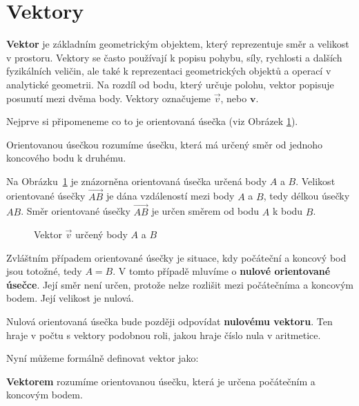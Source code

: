 \section{Vektory}\label{sec:vectors}

\textbf{Vektor} je základním geometrickým objektem, který reprezentuje směr a velikost v prostoru.
Vektory se často používají k popisu pohybu, síly, rychlosti a dalších fyzikálních veličin, 
ale také k reprezentaci geometrických objektů a operací v analytické geometrii.
Na rozdíl od bodu, který určuje polohu, vektor popisuje posunutí mezi dvěma body.
Vektory označujeme $\vec{v}$, nebo $\mathbf{v}$. 

Nejprve si připomeneme co to je orientovaná úsečka (viz Obrázek \ref{fig:oriented_segment}).
\begin{definition}\label{def:oriented_segment}
    Orientovanou úsečkou rozumíme úsečku, která má určený směr od jednoho koncového bodu k druhému.    
\end{definition}

Na Obrázku~\ref{fig:oriented_segment} je znázorněna orientovaná úsečka určená body $A$ a $B$.
Velikost orientované úsečky $\overrightarrow{AB}$ je dána vzdáleností mezi body $A$ a $B$, 
tedy délkou úsečky $AB$. Směr orientované úsečky $\overrightarrow{AB}$ je určen směrem od bodu $A$ k bodu $B$.


\begin{figure}[H]
    \centering
    \caption{Vektor $\vec{v}$ určený body $A$ a $B$}
    \label{fig:oriented_segment}
\end{figure}

Zvláštním případem orientované úsečky je situace, kdy počáteční a koncový bod jsou totožné, tedy $A = B$.
V tomto případě mluvíme o \textbf{nulové orientované úsečce}. 
Její směr není určen, protože nelze rozlišit mezi počátečníma a koncovým bodem.
Její velikost je nulová.

\begin{remark}
Nulová orientovaná úsečka bude později odpovídat \textbf{nulovému vektoru}.
Ten hraje v počtu s vektory podobnou roli, jakou hraje číslo nula v aritmetice.
\end{remark}

Nyní můžeme formálně definovat vektor jako:

\begin{definition}\label{def:vector}
    \textbf{Vektorem} rozumíme orientovanou úsečku, která je určena počátečním a koncovým bodem.
\end{definition}

